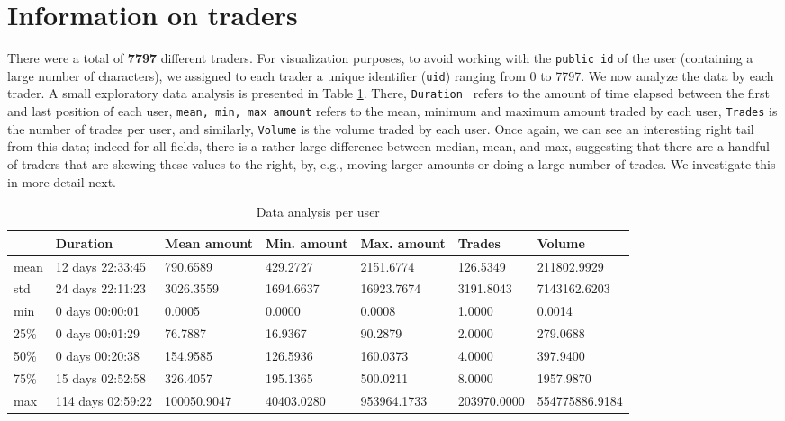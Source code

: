 \documentclass[]{scrartcl}
\begin{document}
	\section{Information on traders}
	There were a total of  \textbf{7797} different traders. For visualization purposes, to avoid working with the \texttt{public id} of the user (containing a large number of characters), we assigned to each trader a unique identifier (\texttt{uid}) ranging from 0 to 7797.  We now analyze the data by each trader. A small exploratory data analysis is presented in Table \ref{tab:da2}. There, \texttt{Duration } refers to the amount of time elapsed between the first and last position of each user, \texttt{mean, min, max amount} refers to the mean, minimum and maximum amount traded by each user, \texttt{Trades} is the number of trades per user, and similarly, \texttt{Volume} is the volume traded by each user.  Once again, we can see an interesting right tail from this data; indeed for all fields, there is a rather large difference between median, mean, and max, suggesting that there are a handful of traders that are skewing these values to the right, by, e.g.,  moving larger amounts or doing a large number of trades. We investigate this in more detail next.
	
	\begin{table}[]\scriptsize{
			\begin{tabular}{@{}lllllll@{}}
				\toprule
				& Duration           & Mean amount & Min. amount & Max. amount & Trades & Volume    \\ \midrule
				mean & 12 days 22:33:45  & 790.6589     & 429.2727    & 2151.6774   & 126.5349            & 211802.9929    \\
				std  & 24 days 22:11:23  & 3026.3559    & 1694.6637   & 16923.7674  & 3191.8043           & 7143162.6203   \\
				min  & 0 days 00:00:01     & 0.0005   & 0.0000   & 0.0008   & 1.0000 & 0.0014    \\
				25\% & 0 days 00:01:29  & 76.7887  & 16.9367  & 90.2879  & 2.0000 & 279.0688  \\
				50\% & 0 days 00:20:38  & 154.9585 & 126.5936 & 160.0373 & 4.0000 & 397.9400  \\
				75\% & 15 days 02:52:58 & 326.4057 & 195.1365 & 500.0211 & 8.0000 & 1957.9870 \\
				max  & 114 days 02:59:22 & 100050.9047  & 40403.0280  & 953964.1733 & 203970.0000         & 554775886.9184 \\ \bottomrule
		\end{tabular}}
		\caption{Data analysis per user \label{tab:da2}}
	\end{table}
	
\end{document}
